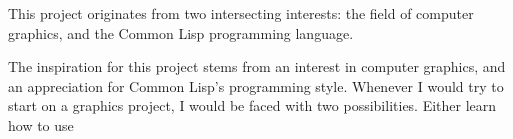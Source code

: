 
This project originates from two intersecting interests:
the field of computer graphics,
and the Common Lisp programming language.

The inspiration for this project stems from an interest in computer graphics,
and an appreciation for Common Lisp's programming style.
Whenever I would try to start on a graphics project,
I would be faced with two possibilities.
Either learn how to use 
